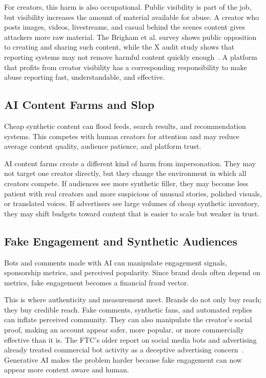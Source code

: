 \documentclass[11pt]{article}
\begin{document}
For creators, this harm is also occupational. Public visibility is part of the job, but visibility increases the amount of material available for abuse. A creator who posts images, videos, livestreams, and casual behind the scenes content gives attackers more raw material. The Brigham et al. survey shows public opposition to creating and sharing such content, while the X audit study shows that reporting systems may not remove harmful content quickly enough~\cite{brigham2024violation,li2024reporting}. A platform that profits from creator visibility has a corresponding responsibility to make abuse reporting fast, understandable, and effective.

\subsection{AI Content Farms and Slop}

Cheap synthetic content can flood feeds, search results, and recommendation systems. This competes with human creators for attention and may reduce average content quality, audience patience, and platform trust.

AI content farms create a different kind of harm from impersonation. They may not target one creator directly, but they change the environment in which all creators compete. If audiences see more synthetic filler, they may become less patient with real creators and more suspicious of unusual stories, polished visuals, or translated voices. If advertisers see large volumes of cheap synthetic inventory, they may shift budgets toward content that is easier to scale but weaker in trust.

\subsection{Fake Engagement and Synthetic Audiences}

Bots and comments made with AI can manipulate engagement signals, sponsorship metrics, and perceived popularity. Since brand deals often depend on metrics, fake engagement becomes a financial fraud vector.

This is where authenticity and measurement meet. Brands do not only buy reach; they buy credible reach. Fake comments, synthetic fans, and automated replies can inflate perceived community. They can also manipulate the creator's social proof, making an account appear safer, more popular, or more commercially effective than it is. The FTC's older report on social media bots and advertising already treated commercial bot activity as a deceptive advertising concern~\cite{ftc2019bots}. Generative AI makes the problem harder because fake engagement can now appear more context aware and human.
\end{document}
